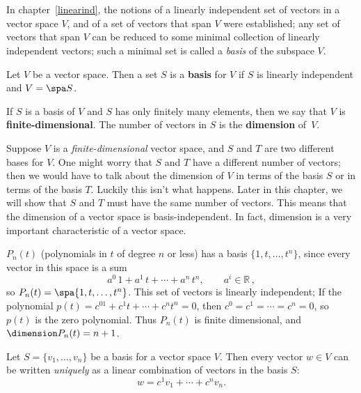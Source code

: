 \chapter{\basisDimTitle}\label{basisdimension}

\label{sec:dimension}
\label{dimension}
In chapter~\ref{linearind}, the notions of   a linearly independent set of vectors in a vector space $V$, and of a set of vectors that span $V$ were established; any set of vectors that span $V$ can be reduced to some minimal collection of linearly independent vectors; such a minimal set is called a \emph{basis} of the subspace $V$.  

\begin{definition}
Let $V$ be a vector space.  Then a set $S$ is a {\bfseries basis} for $V$ if $S$ is linearly independent and $V=\spa S$.


If $S$ is a basis of $V$ and $S$ has only finitely many elements, then we say that $V$ is {\bfseries finite-dimensional}.  The number of vectors in $S$ is the {\bfseries dimension} of~$V$.
\end{definition}

Suppose $V$ is a \emph{finite-dimensional} vector space, and $S$ and $T$ are two different bases for $V$.  One might worry that $S$ and $T$ have a different number of vectors; then we would have to talk about the dimension of $V$ in terms of the basis $S$ or in terms of the basis $T$.  Luckily this isn't what happens.
Later in this chapter, we will show that $S$ and $T$ must have the same number of vectors.  This means that the dimension of a vector space is basis-independent.  In fact, dimension is a very important  characteristic of a vector space.%

\begin{example}
$P_n(t)$ (polynomials in $t$ of degree $n$ or less) has a basis $\{1,t,\ldots , t^n \}$, since every vector in this space is a sum
\[
a^0\,1+a^1\,t+\cdots +a^n\,t^n, \qquad a^i\in \mathbb{R}\, ,
\]
so $P_n(t)=\spa \{1,t,\ldots , t^n \}$.  This set of vectors is linearly independent;  If the polynomial $p(t)=c^01+c^1t+\cdots +c^nt^n=0$, then $c^0=c^1=\cdots =c^n=0$, so $p(t)$ is the zero polynomial.  
Thus $P_n(t)$ is finite dimensional, and $\dimension P_n(t)=n+1$.
\end{example}



\begin{theorem}\label{uniqvec}
Let $S=\{v_1, \ldots, v_n \}$  be a basis for a vector space $V$.  Then every vector $w \in V$ can be written \emph{uniquely} as a linear combination of vectors in the basis $S$:
\[
w=c^1v_1+\cdots + c^nv_n.
\]
\end{theorem}

